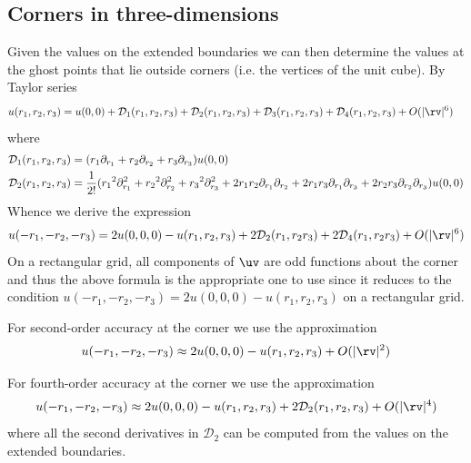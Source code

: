 \documentclass[10pt]{article}
\newcommand{\Ds}{{\mathcal D}}%
\newcommand{\ra}{{r_1}}%
\newcommand{\rb}{{r_2}}%
\newcommand{\rc}{{r_3}}%
\begin{document}

\clearpage
\subsection{Corners in three-dimensions}


Given the values on the extended boundaries we can then determine the 
values at the ghost points that lie outside corners (i.e. the vertices of the unit cube).
By Taylor series
\begin{align*}
  u(\ra,\rb,\rc)&= u(0,0) + \Ds_1(\ra,\rb,\rc) + \Ds_2(\ra,\rb,\rc) + \Ds_3(\ra,\rb,\rc) + \Ds_4(\ra,\rb,\rc) + \trunc
\end{align*}
where
\begin{align*}
  \Ds_1(\ra,\rb,\rc) &= (\ra \partial_\ra + \rb \partial_\rb + \rc \partial_\rc ) u(0,0) \\
  \Ds_2(\ra,\rb,\rc) &= {1\over2!}( \ra^2\partial_\ra^2+\rb^2\partial_\rb^2 +\rc^2\partial_\rc^2
                         + 2\ra\rb\partial_\ra\partial_\rb 
                         + 2\ra\rc\partial_\ra\partial_\rc + 2\rb\rc\partial_\rb\partial_\rc 
                     )u(0,0)  \\
\end{align*}
Whence we derive the expression
\begin{align}
 u(-\ra,-\rb,-\rc) &= 2 u(0,0,0) - u(\ra,\rb,\rc) + 2\Ds_2(\ra,\rb\rc) + 2\Ds_4(\ra,\rb\rc)+ \trunc \label{taylor1} \\
\end{align}
On a rectangular grid, all components of $\uv$ are odd functions about the corner and thus
the above formula is the appropriate one to use since it reduces to the condition
$u(-\ra,-\rb,-\rc) = 2 u(0,0,0) - u(\ra,\rb,\rc)$ on a rectangular grid.

For second-order accuracy at the corner we use the approximation
\begin{align}
   u(-\ra,-\rb,-\rc) &\approx 2 u(0,0,0) - u(\ra,\rb,\rc) + \trunca \\
\end{align}

For fourth-order accuracy  at the corner we use the approximation
\begin{align}
   u(-\ra,-\rb,-\rc) &\approx 2 u(0,0,0) - u(\ra,\rb,\rc) + 2\Ds_2(\ra,\rb,\rc) + \truncb \\
\end{align}
where all the second derivatives in $\Ds_2$ can be computed from the values on the extended boundaries.
\end{document}
